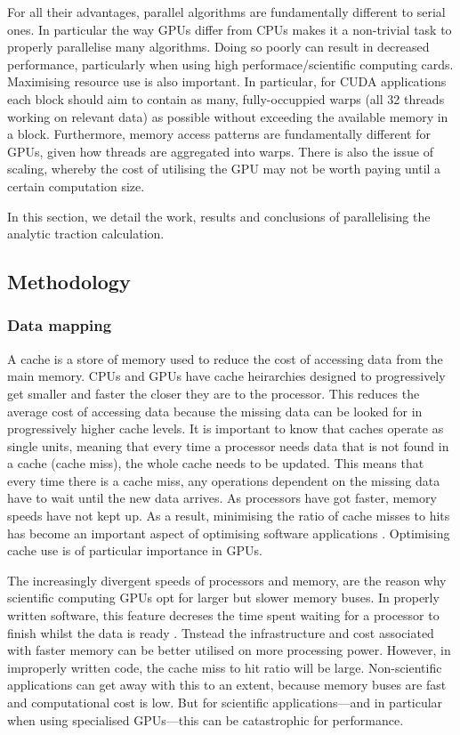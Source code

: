 For all their advantages, parallel algorithms are fundamentally different to serial ones. In particular the way GPUs differ from CPUs makes it a non-trivial task to properly parallelise many algorithms. Doing so poorly can result in decreased performance, particularly when using high performace/scientific computing cards. Maximising resource use is also important. In particular, for CUDA applications each block should aim to contain as many, fully-occuppied warps (all 32 threads working on relevant data) as possible without exceeding the available memory in a block. Furthermore, memory access patterns are fundamentally different for GPUs, given how threads are aggregated into warps. There is also the issue of scaling, whereby the cost of utilising the GPU may not be worth paying until a certain computation size.

In this section, we detail the work, results and conclusions of parallelising the analytic traction calculation.

\subsection{Methodology}

\subsubsection{Data mapping}

A cache is a store of memory used to reduce the cost of accessing data from the main memory. CPUs and GPUs have cache heirarchies designed to progressively get smaller and faster the closer they are to the processor. This reduces the average cost of accessing data because the missing data can be looked for in progressively higher cache levels. It is important to know that caches operate as single units, meaning that every time a processor needs data that is not found in a cache (cache miss), the whole cache needs to be updated. This means that every time there is a cache miss, any operations dependent on the missing data have to wait until the new data arrives. As processors have got faster, memory speeds have not kept up. As a result, minimising the ratio of cache misses to hits has become an important aspect of optimising software applications \cite{cpuMemDiv,gpuMemDiv}. Optimising cache use is of particular importance in GPUs.

The increasingly divergent speeds of processors and memory, are the reason why scientific computing GPUs opt for larger but slower memory buses. In properly written software, this feature decreses the time spent waiting for a processor to finish whilst the data is ready \cite{gpuCache,sharedCache,gpuMemDiv2}. Tnstead the infrastructure and cost associated with faster memory can be better utilised on more processing power. However, in improperly written code, the cache miss to hit ratio will be large. Non-scientific applications can get away with this to an extent, because memory buses are fast and computational cost is low. But for scientific applications---and in particular when using specialised GPUs---this can be catastrophic for performance.

